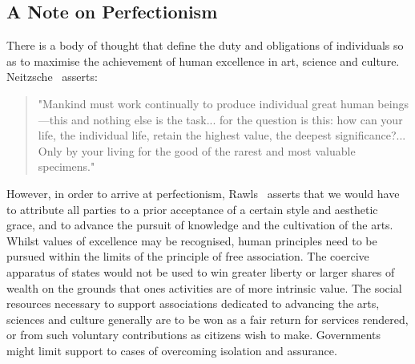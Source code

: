 \documentclass[11pt, oneside]{article}   	%
\begin{document}
\subsection{A Note on Perfectionism}

There is a body of thought that define the duty and obligations of individuals so as to maximise the achievement of human excellence in art, science and culture. Neitzsche~\cite{gam1} asserts:

\begin{quote}
"Mankind must work continually to produce individual great human beings---this and nothing else is the task... for the question is this: how can your life, the individual life, retain the highest value, the deepest significance?... Only by your living for the good of the rarest and most valuable specimens."
\end{quote}
However, in order to arrive at perfectionism, Rawls~\cite{jr1} asserts that we would have to attribute all parties to a prior acceptance of a certain style and aesthetic grace, and to advance the pursuit of knowledge and the cultivation of the arts.
Whilst values of excellence may be recognised, human principles need to be pursued within the limits of the principle of free association.
The coercive apparatus of states would not be used to win greater liberty or larger shares of wealth on the grounds that ones activities are of more intrinsic value.
The social resources necessary to support associations dedicated to advancing the arts, sciences and culture generally are to be won as a fair return for services rendered, or from such voluntary contributions as citizens wish to make.
Governments might limit support to cases of overcoming isolation and assurance.
\end{document}
